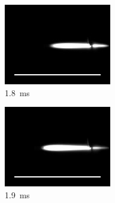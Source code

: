 \begin{figure}[h]
\begin{subfigure}[t]{0.3\textwidth}
        \centering
        \includegraphics[width=\textwidth]{assets/5 results/ignitionFrames/18.jpg}
        \caption{\qty{1.8}{ms}}
        \label{fig:ignition_frames_18}
    \end{subfigure}
    \begin{subfigure}[t]{0.3\textwidth}
        \centering
        \includegraphics[width=\textwidth]{assets/5 results/ignitionFrames/19.jpg}
        \caption{\qty{1.9}{ms}}
        \label{fig:ignition_frames_19}
    \end{subfigure}
    \hfill
    \begin{subfigure}[t]{0.3\textwidth}
        \centering

\end{subfigure}
\end{figure}
